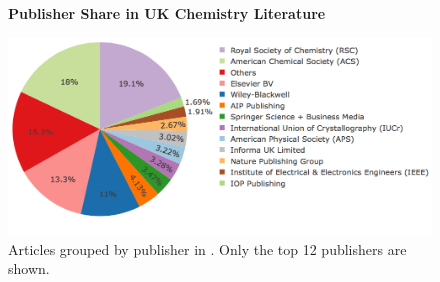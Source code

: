 \begin{figure}[H]
    \centering
    \textbf{Publisher Share in UK Chemistry Literature}\par\medskip
    \includegraphics[width=\textwidth]{Data_Acquisition/uk_publishers_pie.png}
    \caption[Publisher Share in UK Chemistry Literature]{Articles grouped by publisher in . Only the top 12 publishers are shown.}
     \label{fig:UKPUBPI}
\end{figure}

